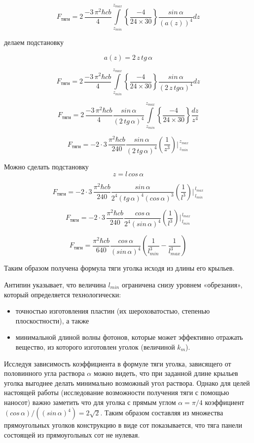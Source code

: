 \documentclass[11pt]{article}
\begin{document}
\[F_{тяги} = 2\, \frac{-3\,\pi^2\hbar c b}{4}\int\limits_{z_{min}}^{z_{max}} \left\{\frac{-4}{24\times30}\right\}\frac{sin\, \alpha}{\left(a\left(z\right)\right)^4}dz\]

делаем подстановку

\[a\left(z\right) = 2\,z\,tg\, \alpha\]

\[F_{тяги} = 2\, \frac{-3\,\pi^2\hbar c b}{4}\int\limits_{z_{min}}^{z_{max}} \left\{\frac{-4}{24\times30}\right\}\frac{sin\, \alpha}{\left(2\,z\,tg \alpha\right)^4}dz\]

\[F_{тяги} = 2\, \frac{-3\,\pi^2\hbar c b}{4} \frac{sin\, \alpha}{\left(2\,tg\, \alpha\right)^4} \int\limits_{z_{min}}^{z_{max}} \left\{\frac{-4}{24\times30}\right\} \frac{dz}{z^4}\]

\[F_{тяги} = -2\cdot3\, \frac{\pi^2\hbar c b}{240} \frac{sin\, \alpha}{\left(2\,tg\, \alpha\right)^4} \left(\frac{1}{z^3}\right)\Bigg\rvert_{\,z_{min}}^{\,z_{max}} \]

    Можно сделать подстановку \[z = l\, cos\, \alpha\]

\[F_{тяги} = -2\cdot3\, \frac{\pi^2\hbar c b}{240} \frac{sin\, \alpha}{2^4\left(tg\,\alpha\right)^4\left(cos\, \alpha\right)^3} \left(\frac{1}{l^3}\right)\Bigg\rvert_{\,l_{min}}^{\,l_{max}} \]

\[F_{тяги} = -2\cdot3\, \frac{\pi^2\hbar c b}{240} \frac{cos\, \alpha}{2^4\left(sin\, \alpha\right)^4} \left(\frac{1}{l^3}\right)\Bigg\rvert_{\,l_{min}}^{\,l_{max}} \]

\[F_{тяги} = \frac{\pi^2\hbar c b}{640} \frac{cos\, \alpha}{\left(sin\, \alpha\right)^4} \left(\frac{1}{l_{min}^3} - \frac{1}{l_{max}^3}\right)\]

Таким образом получена формула тяги уголка исходя из длины его крыльев.

Антипин указывает, что величина \(l_{min}\) ограничена снизу уровнем
«обрезания», который определяется технологически:

\begin{itemize}
\item
  точностью изготовления пластин (их шероховатостью, степенью
  плоскостности), а также
\item
  минимальной длиной волны фотонов, которые может эффективно отражать
  вещество, из которого изготовлен уголок (величиной \(k_m\)).
\end{itemize}

    Исследуя зависимость коэффициента в формуле тяги уголка, зависящего от
половинного угла раствора \(\alpha\) можно видеть, что при заданной
длине крыльев уголка выгоднее делать минимально возможный угол раствора.
Однако для целей настоящей работы (исследование возможности получения
тяги с помощью наносот) важно заметить что для уголка с прямым углом
\(\alpha = {\pi}/{4}\) коэффициент
\(\left({cos\, \alpha}\right)\big/\left({\left(sin\, \alpha\right)^4}\right) = 2\sqrt{2}\).
Таким образом составляя из множества прямоугольных уголков конструкцию в
виде сот показывается, что тяга панели состоящей из прямоугольных сот не
нулевая.
\end{document}
